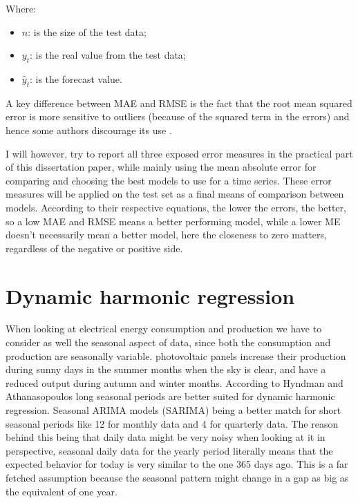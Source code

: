 \documentclass[12pt,a4paper,titlepage]{report}
\begin{document}
Where:
\begin{itemize}
    \item $ n $: is the size of the test data;
    \item $ y_{t} $: is the real value from the test data;
    \item $ \hat{y}_{t} $: is the forecast value.
\end{itemize} 

A key difference between MAE and RMSE is the fact that the root mean squared error is more sensitive to outliers (because of the squared term in the errors) and hence some authors discourage its use \cite{armstrongevaluatingforecastingmethods}.

I will however, try to report all three exposed error measures in the practical part of this dissertation paper, while mainly using the mean absolute error for comparing and choosing the best models to use for a time series.
These error measures will be applied on the test set as a final means of comparison between models. According to their respective equations, the lower the errors, the better, so a low MAE and RMSE means a better performing model, while a lower ME doesn't necessarily mean a better model, here the closeness to zero matters, regardless of the negative or positive side.


\section{Dynamic harmonic regression} \label{dynamicharmonicregression}
When looking at electrical energy consumption and production we have to consider as well the seasonal aspect of data, since both the consumption and production are seasonally variable. photovoltaic panels increase their production during sunny days in the summer months when the sky is clear, and have a reduced output during autumn and winter months.
According to Hyndman and Athanasopoulos \cite{fpp2dhr} long seasonal periods are better suited for dynamic harmonic regression. Seasonal ARIMA models (SARIMA) being a better match for short seasonal periods like 12 for monthly data and 4 for quarterly data.
The reason behind this being that daily data might be very noisy when looking at it in perspective, seasonal daily data for the yearly period literally means that the expected behavior for today is very similar to the one 365 days ago. This is a far fetched assumption because the seasonal pattern might change in a gap as big as the equivalent of one year.
\end{document}
